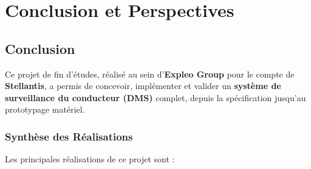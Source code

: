 \documentclass[12pt,a4paper,twoside]{report}
\newcommand{\keyword}[1]{\textbf{\textcolor{stellantisblue}{#1}}}
\begin{document}
\chapter{Conclusion et Perspectives}

\section{Conclusion}

Ce projet de fin d'études, réalisé au sein d'\textbf{Expleo Group} pour le compte de \textbf{Stellantis}, a permis de concevoir, implémenter et valider un \keyword{système de surveillance du conducteur (DMS)} complet, depuis la spécification jusqu'au prototypage matériel.

\subsection{Synthèse des Réalisations}

Les principales réalisations de ce projet sont :
\end{document}
